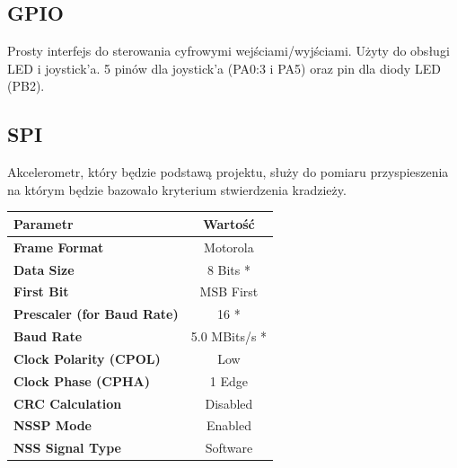 \documentclass[10pt, a4paper]{article}
\begin{document}
\subsection{GPIO}
Prosty interfejs do sterowania cyfrowymi wejściami/wyjściami. Użyty do obsługi LED i joystick'a. 5 pinów dla joystick'a (PA0:3 i PA5) oraz pin dla diody LED (PB2).

\subsection{SPI}
Akcelerometr, który będzie podstawą projektu, służy do pomiaru przyspieszenia na którym będzie bazowało kryterium stwierdzenia kradzieży.

\begin{table}[H]
\centering
\begin{tabular}{|l|c|}
\hline
\textbf{Parametr} & Wartość \\
\hline
\hline
\textbf{Frame Format} & Motorola \\ \hline
\textbf{Data Size} & 8 Bits * \\ \hline
\textbf{First Bit} & MSB First \\ \hline
\textbf{Prescaler (for Baud Rate)} & 16 * \\ \hline
\textbf{Baud Rate} & 5.0 MBits/s * \\ \hline
\textbf{Clock Polarity (CPOL)} & Low \\ \hline
\textbf{Clock Phase (CPHA)} & 1 Edge \\ \hline
\textbf{CRC Calculation} & Disabled \\ \hline
\textbf{NSSP Mode} & Enabled \\ \hline
\textbf{NSS Signal Type} & Software \\ \hline
\end{tabular}
\end{table}
\end{document}
